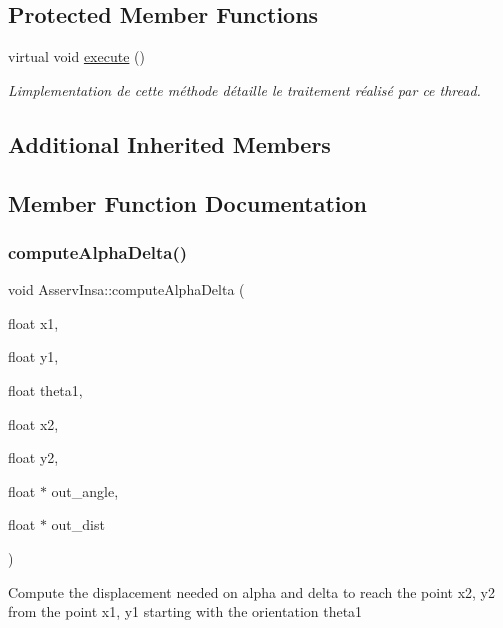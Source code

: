 \subsection*{Protected Member Functions}
\begin{DoxyCompactItemize}
\item 
\mbox{\label{classAsservInsa_a67295285fc3a26cb25c99a1f9a88db2c}} 
virtual void \hyperlink{classAsservInsa_a67295285fc3a26cb25c99a1f9a88db2c}{execute} ()
\begin{DoxyCompactList}\small\item\em L\textquotesingle{}implementation de cette méthode détaille le traitement réalisé par ce thread. \end{DoxyCompactList}\end{DoxyCompactItemize}
\subsection*{Additional Inherited Members}


\subsection{Member Function Documentation}
\mbox{\label{classAsservInsa_af139b79d3547a044dbf921e5984bc3cd}} 
\subsubsection{\texorpdfstring{compute\+Alpha\+Delta()}{computeAlphaDelta()}}
{\footnotesize\ttfamily void Asserv\+Insa\+::compute\+Alpha\+Delta (\begin{DoxyParamCaption}\item[{float}]{x1,  }\item[{float}]{y1,  }\item[{float}]{theta1,  }\item[{float}]{x2,  }\item[{float}]{y2,  }\item[{float $\ast$}]{out\+\_\+angle,  }\item[{float $\ast$}]{out\+\_\+dist }\end{DoxyParamCaption})}

Compute the displacement needed on alpha and delta to reach the point x2, y2 from the point x1, y1 starting with the orientation theta1 \mbox{\label{classAsservInsa_a76cc56c8240ee5f95dd15f4d3097f9a7}} 
